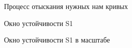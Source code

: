 \documentclass[12pt, a4paper]{article}
\begin{document}
\begin{figure}[H]
	\caption{Процесс отыскания нужных нам кривых}
\end{figure}

\begin{figure}[H]
	\caption{Окно устойчивости S1}
\end{figure}

\begin{figure}[H]
	\caption{Окно устойчивости S1 в масштабе}
\end{figure}
\end{document}
